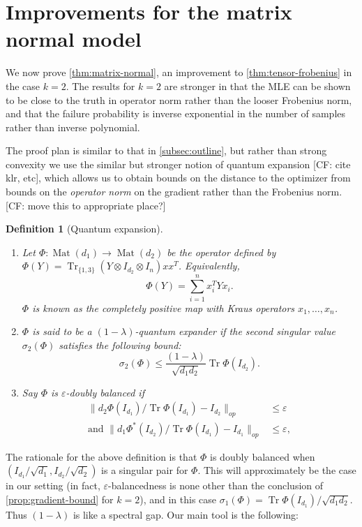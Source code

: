 \documentclass{article}
\newtheorem{definition}{Definition}
\newcommand{\ot}{\otimes}
\newcommand{\mat}{\operatorname{Mat}}
\newcommand\eps{\varepsilon}
\newcommand\samp{x}
\newcommand\tr{\operatorname{Tr}}
\newcommand{\CF}[1]{{\color{purple}[CF: #1]}}
\begin{document}

\section{Improvements for the matrix normal model}\label{sec:matrix-normal}
We now prove \cref{thm:matrix-normal}, an improvement to \cref{thm:tensor-frobenius} in the case $k=2$. The results for $k = 2$ are stronger in that the MLE can be shown to be close to the truth in operator norm rather than the looser Frobenius norm, and that the failure probability is inverse exponential in the number of samples rather than inverse polynomial.




The proof plan is similar to that in \cref{subsec:outline}, but rather than strong convexity we use the similar but stronger notion of quantum expansion \CF{cite klr, etc}, which allows us to obtain bounds on the distance to the optimizer from bounds on the \emph{operator norm} on the gradient rather than the Frobenius norm.
\CF{move this to appropriate place?}
\begin{definition}[Quantum expansion]
$ $
\begin{enumerate}
\item Let $\Phi:\mat(d_1) \to \mat(d_2)$ be the operator defined by $\Phi(Y) = \tr_{\{1,3\}} ( Y \ot I_{d_2} \ot I_{n}) \samp \samp^T$. Equivalently,
$$\Phi(Y) = \sum_{i = 1}^n \samp_i^T Y \samp_i.$$
$\Phi$ is known as the \emph{completely positive map} with Kraus operators $\samp_1, \dots, \samp_n$.
\item $\Phi$ is said to be a \emph{$(1 - \lambda)$-quantum expander} if the second singular value $\sigma_2(\Phi)$ satisfies the following bound:
$$\sigma_2(\Phi) \leq \frac{(1 - \lambda)}{\sqrt{d_1d_2}} \tr \Phi(I_{d_2}).$$
\item Say $\Phi$ is \emph{$\eps$-doubly balanced} if
\begin{align*}
\|d_2 \Phi(I_{d_1})/\tr \Phi(I_{d_1})  - I_{d_2} \|_{op}& \leq \eps\\
\textrm{and }\|d_1 \Phi^*(I_{d_2})/\tr \Phi(I_{d_1})  - I_{d_1}  \|_{op} & \leq \eps,
\end{align*}
\end{enumerate}
\end{definition}

The rationale for the above definition is that $\Phi$ is doubly balanced when $(I_{d_1}/\sqrt{d_1}, I_{d_2}/\sqrt{d_2})$ is a singular pair for $\Phi$. This will approximately be the case in our setting (in fact, $\eps$-balancedness is none other than the conclusion of \cref{prop:gradient-bound} for $k = 2$), and in this case $\sigma_1(\Phi) =  \tr \Phi(I_{d_1})/\sqrt{d_1 d_2}.$ Thus $(1-\lambda)$ is like a spectral gap.
Our main tool is the following:
\end{document}
